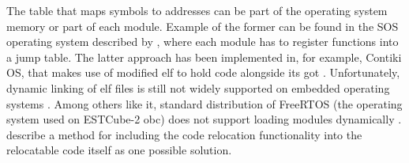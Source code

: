 The table that maps symbols to addresses can be part of the operating system memory or part of each module. Example of the former can be found in the SOS operating system described by \textcite{Han2005}, where each module has to register functions into a jump table. The latter approach has been implemented in, for example, Contiki OS, that makes use of modified \gls{elf} to hold code alongside its \gls{got} \cite{Dunkels2006}. Unfortunately, dynamic linking of \gls{elf} files is still not widely supported on embedded operating systems \cite{Xinyu2017}. Among others like it, standard distribution of FreeRTOS (the operating system used on ESTCube-2 \gls{obc}) does not support loading modules dynamically \cite{Barry2005}. \textcite{Xinyu2017} describe a method for including the code relocation functionality into the relocatable code itself as one possible solution.
